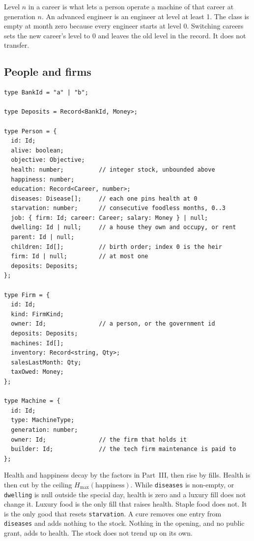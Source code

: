 \documentclass[11pt]{article}
\newenvironment{keep}{\noindent\begin{minipage}{\linewidth}}{\end{minipage}}
\begin{document}
Level $n$ in a career is what lets a person operate a machine of that career
at generation $n$. An advanced engineer is an engineer at level at least 1.
The class is empty at month zero because every engineer starts at level 0.
Switching careers sets the new career's level to 0 and leaves the old level
in the record. It does not transfer.

\subsection{People and firms}

\begin{keep}
\begin{lstlisting}
type BankId = "a" | "b";

type Deposits = Record<BankId, Money>;

type Person = {
  id: Id;
  alive: boolean;
  objective: Objective;
  health: number;          // integer stock, unbounded above
  happiness: number;
  education: Record<Career, number>;
  diseases: Disease[];     // each one pins health at 0
  starvation: number;      // consecutive foodless months, 0..3
  job: { firm: Id; career: Career; salary: Money } | null;
  dwelling: Id | null;     // a house they own and occupy, or rent
  parent: Id | null;
  children: Id[];          // birth order; index 0 is the heir
  firm: Id | null;         // at most one
  deposits: Deposits;
};

type Firm = {
  id: Id;
  kind: FirmKind;
  owner: Id;               // a person, or the government id
  deposits: Deposits;
  machines: Id[];
  inventory: Record<string, Qty>;
  salesLastMonth: Qty;
  taxOwed: Money;
};

type Machine = {
  id: Id;
  type: MachineType;
  generation: number;
  owner: Id;               // the firm that holds it
  builder: Id;             // the tech firm maintenance is paid to
};
\end{lstlisting}
\end{keep}

Health and happiness decay by the factors in Part~III, then rise by fills.
Health is then cut by the ceiling $H_{\max}(\mathrm{happiness})$. While
\texttt{diseases} is non-empty, or \texttt{dwelling} is null outside the
special day, health is zero and a luxury fill does not change it.
Luxury food is the only fill that raises health. Staple food does not.
It is the only good that resets \texttt{starvation}. A cure removes one
entry from \texttt{diseases} and adds nothing to the stock. Nothing in the
opening, and no public grant, adds to health. The stock does not trend up
on its own.
\end{document}
